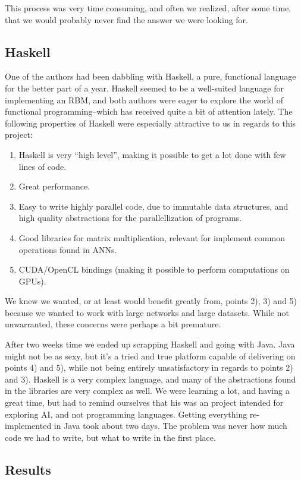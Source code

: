 \documentclass[11pt]{article}
\begin{document}
This process was very time consuming, and often we realized, after some time, that we would probably never find the answer we were looking for.
\subsection{Haskell}

One of the authors had been dabbling with Haskell, a pure, functional language for the better part of a year.  Haskell seemed to be a well-suited language for implementing an RBM, and both authors were eager to explore the world of functional programming--which has received quite a bit of attention lately.  The following properties of Haskell were especially attractive to us in regards to this project:
\begin{enumerate}
 \item Haskell is very ``high level'', making it possible to get a lot done with few lines of code.
 \item Great performance.
 \item Easy to write highly parallel code, due to immutable data structures, and high quality abstractions for the parallellization of programs.
 \item Good libraries for matrix multiplication, relevant for implement common operations found in ANNs.
 \item CUDA/OpenCL bindings (making it possible to perform computations on GPUs).
\end{enumerate}

We knew we wanted, or at least would benefit greatly from, points 2), 3) and 5) because we wanted to work with large networks and large datasets.  While not unwarranted, these concerns were perhaps a bit premature.

After two weeks time we ended up scrapping Haskell and going with Java.  Java might not be as sexy, but it's a tried and true platform capable of delivering on points 4) and 5), while not being entirely unsatisfactory in regards to points 2) and 3).  Haskell is a very complex language, and many of the abstractions found in the libraries are very complex as well.  We were learning a lot, and having a great time, but had to remind ourselves that his was an project intended for exploring AI, and not programming languages.  Getting everything re-implemented in Java took about two days.  The problem was never how much code we had to write, but what to write in the first place.

\subsection{Results}
\end{document}
